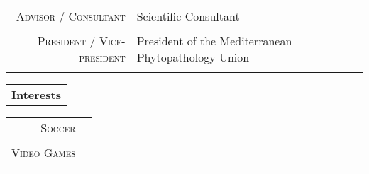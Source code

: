 \documentclass [a4paper,10pt]{article}
\begin{document}
\begin{tabular}{r p{11cm}}	
\textsc{Advisor / Consultant} & Scientific Consultant\\ \\
\textsc{President / Vice-president} & President of the Mediterranean Phytopathology Union\\ \\
\end{tabular}
\begin{tabular}{r}
\large
\textbf{Interests}
\normalsize
\end{tabular}

\begin{tabular}{r p{11cm}}	
\textsc{Soccer} & \\ \\
\textsc{Video Games} & \\ \\
\end{tabular}
\end{document}
